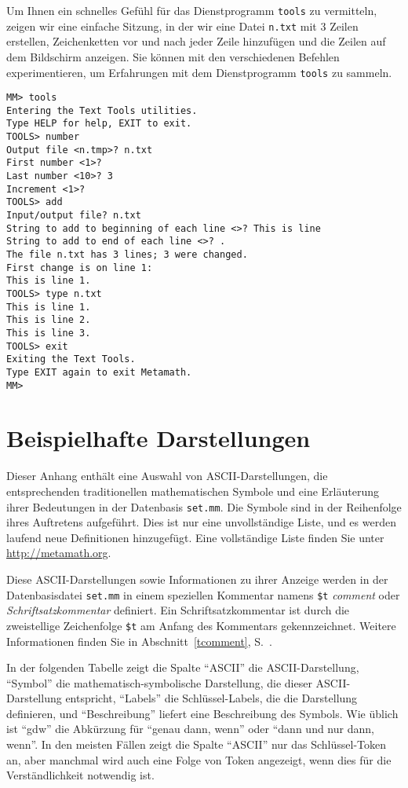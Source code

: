 Um Ihnen ein schnelles Gefühl für das Dienstprogramm \texttt{tools} zu vermitteln, zeigen wir eine einfache Sitzung, in der wir eine Datei \texttt{n.txt} mit 3 Zeilen erstellen, Zeichenketten vor und nach jeder Zeile hinzufügen und die Zeilen auf dem Bildschirm anzeigen. Sie können mit den verschiedenen Befehlen experimentieren, um Erfahrungen mit dem Dienstprogramm \texttt{tools} zu sammeln. 

\begin{verbatim}
MM> tools
Entering the Text Tools utilities.
Type HELP for help, EXIT to exit.
TOOLS> number
Output file <n.tmp>? n.txt
First number <1>?
Last number <10>? 3
Increment <1>?
TOOLS> add
Input/output file? n.txt
String to add to beginning of each line <>? This is line
String to add to end of each line <>? .
The file n.txt has 3 lines; 3 were changed.
First change is on line 1:
This is line 1.
TOOLS> type n.txt
This is line 1.
This is line 2.
This is line 3.
TOOLS> exit
Exiting the Text Tools.
Type EXIT again to exit Metamath.
MM>
\end{verbatim}



\appendix
\chapter{Beispielhafte Darstellungen}
\label{ASCII}

Dieser Anhang enthält eine Auswahl von {\sc ASCII}-Darstellungen, die ent\-spre\-chen\-den traditionellen mathematischen Symbole und eine Erläuterung ihrer Bedeutungen in der Datenbasis \texttt{set.mm}. Die Symbole sind in der Reihenfolge ihres Auftretens aufgeführt. Dies ist nur eine unvollständige Liste, und es werden laufend neue Definitionen hinzugefügt. Eine vollständige Liste finden Sie unter \url{http://metamath.org}. 

Diese {\sc ASCII}-Darstellungen sowie Informationen zu ihrer Anzeige werden in der Datenbasisdatei \texttt{set.mm} in einem speziellen Kommentar namens \texttt{\$t} {\em comment} oder {\em Schriftsatzkommentar} definiert. Ein Schriftsatzkommentar ist durch die zweistellige Zeichenfolge \texttt{\$t} am Anfang des Kommentars gekennzeichnet. Weitere Informationen finden Sie in Abschnitt~\ref{tcomment}, S.~\pageref{tcomment}. 

In der folgenden Tabelle zeigt die Spalte "`{\sc ASCII}"' die {\sc ASCII}-Darstellung, "`Symbol"' die mathematisch-symbolische Darstellung, die dieser {\sc ASCII}-Dar\-stel\-lung entspricht, "`Labels"' die Schlüssel-Labels, die die Darstellung de\-fi\-nie\-ren, und "`Beschreibung"' liefert eine Beschreibung des Symbols. Wie üblich ist "`gdw"' die Abkürzung für "`genau dann, wenn"' oder "`dann und nur dann, wenn"'.  In den meisten Fällen zeigt die Spalte "`{\sc ASCII}"' nur das Schlüssel-Token an, aber manchmal wird auch eine Folge von Token angezeigt, wenn dies für die Verständlichkeit notwendig ist. 

